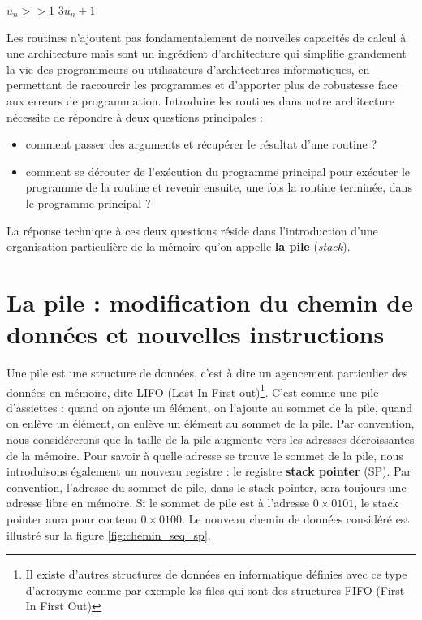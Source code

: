 \begin{algorithm}
\caption{ \label{algo:syr27_proc}}
\begin{algorithmic}[1]
\EndFunction

 
\State \Return $u_n >> 1$
\Else
\State \Return $3 u_n + 1$
\EndIf
\EndFunction
\end{algorithmic}
\end{algorithm}

Les routines n'ajoutent pas fondamentalement de nouvelles capacités de calcul à une architecture mais sont un ingrédient d'architecture qui simplifie grandement la vie des programmeurs ou utilisateurs d'architectures informatiques, en permettant de raccourcir les programmes et d'apporter plus de robustesse face aux erreurs de programmation. Introduire les routines dans notre architecture nécessite de répondre à deux questions principales :
\begin{itemize}
\item comment passer des arguments et récupérer le résultat d'une routine ? 
\item comment se dérouter de l'exécution du programme principal pour exécuter le programme de la routine et revenir ensuite, une fois la routine terminée, dans le programme principal ?
\end{itemize}

La réponse technique à ces deux questions réside dans l'introduction d'une organisation particulière de la mémoire qu'on appelle \textbf{la pile} (\emph{stack}).


\section{La pile : modification du chemin de données et nouvelles instructions}

Une pile est une structure de données, c'est à dire un agencement particulier des données en mémoire, dite LIFO (Last In First out)\footnote{Il existe d'autres structures de données en informatique définies avec ce type d'acronyme comme par exemple les files qui sont des structures FIFO (First In First Out)}. C'est comme une pile d'assiettes : quand on ajoute un élément, on l'ajoute au sommet de la pile, quand on enlève un élément, on enlève un élément au sommet de la pile. Par convention, nous considérerons que la taille de la pile augmente vers les adresses décroissantes de la mémoire. Pour savoir à quelle adresse se trouve le sommet de la pile, nous introduisons également un nouveau registre : le registre \textbf{stack pointer} (SP). Par convention, l'adresse du sommet de pile, dans le stack pointer, sera toujours une adresse libre en mémoire. Si le sommet de pile est à l'adresse $0\times0101$, le stack pointer aura pour contenu $0\times0100$. Le nouveau chemin de données considéré est illustré sur la figure \ref{fig:chemin_seq_sp}. 


